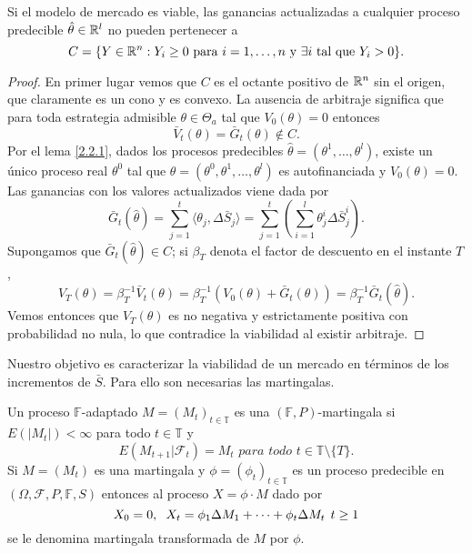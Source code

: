 \bigskip
\begin{lemaBox}\label{3.2.1}
	Si el modelo de mercado es viable, las ganancias actualizadas a cualquier proceso predecible $ \hat{\theta} \in \mathbb{R} ^l $ no pueden pertenecer a 
	\[
	C = \{Y \in \mathbb{R}^n: Y_i \geq 0\text{ para } i=1,\dots,n \text{ y } \exists i \text{ tal que } Y_i > 0\}.
	\]
\end{lemaBox}
\begin{proof}
	En primer lugar vemos que $ C $ es el octante positivo de $ \mathbb{R}^n $ sin el origen, que claramente es un cono y es convexo. La ausencia de arbitraje significa que para toda estrategia admisible $ \theta \in \Theta_a $ tal que $ V_0(\theta) = 0 $ entonces
	\[
	\bar{V}_t(\theta) = \bar{G}_t (\theta) \notin C.
	\]
	Por el lema \ref{2.2.1}, dados los procesos predecibles $ \hat{\theta} = (\theta^1, \dots,\theta^l) $, existe un único proceso real $ \theta^0 $ tal que $ \theta = (\theta^0, \theta^1,\dots, \theta^l) $ es autofinanciada y $ V_0(\theta) = 0 $. Las ganancias con los valores actualizados viene dada por
	\[
	\bar{G}_t(\hat{\theta}) = \sum_{j=1}^{t} \langle \theta_j, \Delta \bar{S}_j \rangle =   \sum_{j=1}^{t} \left( \sum_{i=1}^{l} \theta_j^i \Delta \bar{S}_j^i  \right).
	\]
	Supongamos que $ \bar{G}_t(\hat{\theta}) \in C $; si $ \beta_T $ denota el factor de descuento en el instante $ T $,
	\[
	V_T(\theta) = \beta_T^{-1} \bar{V}_t(\theta) = \beta_T^{-1}(V_0 (\theta) + \bar{G}_t(\theta)) = \beta_T^{-1}\bar{G}_t(\hat{\theta}).
	\]
	Vemos entonces que $ V_T(\theta) $ es no negativa y estrictamente positiva con probabilidad no nula, lo que contradice la viabilidad al existir arbitraje.
\end{proof}
\bigskip
Nuestro objetivo es caracterizar la viabilidad de un mercado en términos de los incrementos de $ \bar{S} $. Para ello son necesarias las martingalas.
\bigskip
\begin{definicion}
	Un proceso $ \mathbb{F} $-adaptado $ M = (M_t)_{t\in \mathbb{T}} $ es una $ ( \mathbb{F},P)$-mar\-tingala si $ E(|M_t|) < \infty $ para todo $ t \in \mathbb{T} $ y 
	\[
	E(M_{t+1}|\mathcal{F}_t) = M_t \textit{ para todo } t \in \mathbb{T}\setminus\{T\}.
	\]
	Si $ M = (M_t) $ es una martingala y $ \phi = (\phi_t)_{t\in \mathbb{T}} $ es un proceso predecible en $ (\Omega, \mathcal{F}, P, \mathbb{F}, S) $ entonces al proceso $ X = \phi \cdot M $ dado por
	\[
	X_0=0, \hspace{2mm}X_t = \phi_1\Delta M_1+\cdots+ \phi_t\Delta M_t \hspace{1.5mm} t \geq1
	\]
	se le denomina martingala transformada de $ M $ por $ \phi $.
\end{definicion}


